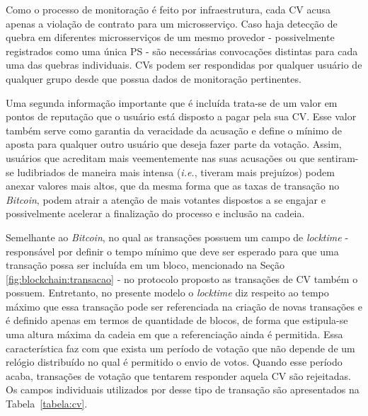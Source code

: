 %
Como o processo de monitoração é feito por infraestrutura, cada \ac{CV} acusa apenas a violação de contrato para um microsserviço. Caso haja detecção de quebra em diferentes microsserviços de um mesmo provedor - possivelmente registrados como uma única \ac{PS} - são necessárias convocações distintas para cada uma das quebras individuais. \acp{CV} podem ser respondidas por qualquer usuário de qualquer grupo desde que possua dados de monitoração pertinentes.

%
Uma segunda informação importante que é incluída trata-se de um valor em pontos de reputação que o usuário está disposto a pagar pela sua \ac{CV}. Esse valor também serve como garantia da veracidade da acusação e define o mínimo de aposta para qualquer outro usuário que deseja fazer parte da votação. Assim, usuários que acreditam mais veementemente nas suas acusações ou que sentiram-se ludibriados de maneira mais intensa (\textit{i.e.}, tiveram mais prejuízos) podem anexar valores mais altos, que da mesma forma que as taxas de transação no \textit{Bitcoin}, podem atrair a atenção de mais votantes dispostos a se engajar e possivelmente acelerar a finalização do processo e inclusão na cadeia.


%
Semelhante ao \textit{Bitcoin}, no qual as transações possuem um campo de \textit{locktime} - responsável por definir o tempo mínimo que deve ser esperado para que uma transação possa ser incluída em um bloco, mencionado na Seção \ref{fig:blockchain:transacao} - no protocolo proposto as transações de \ac{CV} também o possuem. Entretanto, no presente modelo o \textit{locktime} diz respeito ao tempo máximo que essa transação pode ser referenciada na criação de novas transações e é definido apenas em termos de quantidade de blocos, de forma que estipula-se uma altura máxima da cadeia em que a referenciação ainda é permitida. Essa característica faz com que exista um período de votação que não depende de um relógio distribuído no qual é permitido o envio de votos. Quando esse período acaba, transações de votação que tentarem responder aquela \ac{CV} são rejeitadas. Os campos individuais utilizados por desse tipo de transação são apresentados na Tabela~\ref{tabela:cv}.

